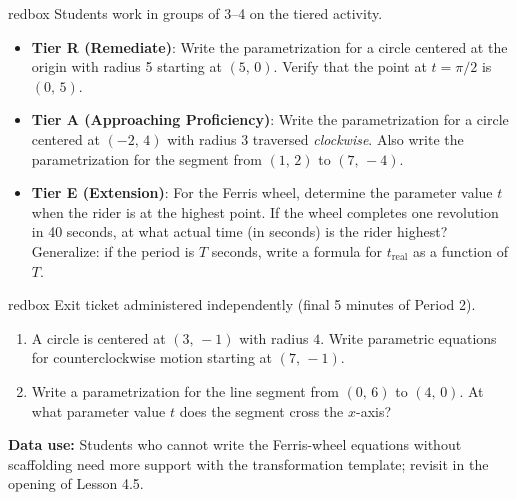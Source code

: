 \documentclass[10pt]{article}
\begin{document}
\begin{skillbox}{redbox}
Students work in groups of 3--4 on the tiered activity.

\begin{itemize}[leftmargin=1.4em, itemsep=4pt]
  \item \textbf{Tier R (Remediate)}: Write the parametrization for a
    circle centered at the origin with radius 5 starting at $(5,\,0)$.
    Verify that the point at $t = \pi/2$ is $(0,\,5)$.
  \item \textbf{Tier A (Approaching Proficiency)}: Write the
    parametrization for a circle centered at $(-2,\,4)$ with radius 3
    traversed \emph{clockwise}. Also write the parametrization for
    the segment from $(1,\,2)$ to $(7,\,-4)$.
  \item \textbf{Tier E (Extension)}: For the Ferris wheel, determine
    the parameter value $t$ when the rider is at the highest point.
    If the wheel completes one revolution in 40 seconds, at what
    actual time (in seconds) is the rider highest? Generalize: if the
    period is $T$ seconds, write a formula for $t_{\text{real}}$ as a
    function of $T$.
\end{itemize}
\end{skillbox}

\vspace{0.08in}

\begin{skillbox}{redbox}
Exit ticket administered independently (final 5 minutes of Period 2).

\begin{enumerate}[leftmargin=1.4em, itemsep=4pt]
  \item A circle is centered at $(3,\,-1)$ with radius $4$. Write
    parametric equations for counterclockwise motion starting at $(7,\,-1)$.
  \item Write a parametrization for the line segment from $(0,\,6)$ to
    $(4,\,0)$. At what parameter value $t$ does the segment cross the
    $x$-axis?
\end{enumerate}

\textbf{Data use:} Students who cannot write the Ferris-wheel equations
without scaffolding need more support with the transformation template;
revisit in the opening of Lesson 4.5.
\end{skillbox}
\end{document}
